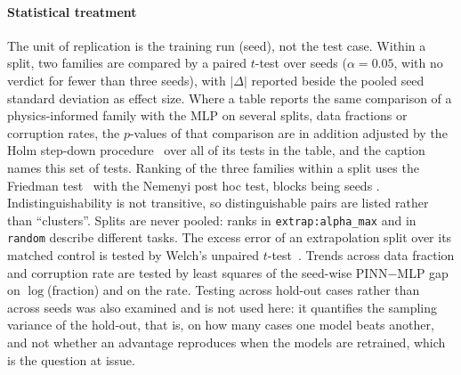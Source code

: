 \paragraph{Statistical treatment}
The unit of replication is the training run (seed), not the test case. Within a
split, two families are compared by a paired $t$-test over seeds ($\alpha=0.05$,
with no verdict for fewer than three seeds), with $|\Delta|$ reported beside the pooled
seed standard deviation as effect size.
Where a table reports the same comparison of a physics-informed family with the MLP
on several splits, data fractions or corruption rates, the $p$-values of that comparison
are in addition adjusted by the Holm step-down procedure~\citep{holm1979} over all of its
tests in the table, and the caption names this set of tests. %
Ranking of the three families within a split uses the Friedman
test~\citep{friedman1937} with the Nemenyi post hoc test, blocks being seeds
\citep{demsar2006}. Indistinguishability is not
transitive, so distinguishable pairs are listed rather than ``clusters''.
Splits are never pooled: ranks in \texttt{extrap:alpha\_max} and in
\texttt{random} describe different tasks.
The excess error of an extrapolation split over its matched control is tested by
Welch's unpaired $t$-test~\citep{welch1947}. Trends across data fraction and corruption rate are tested by
least squares of the seed-wise PINN$-$MLP gap on $\log$(fraction) and on the rate.
Testing across hold-out cases rather than across seeds was also examined and is not used here:
it quantifies the sampling variance of the hold-out, that is, on how many cases one model beats
another, and not whether an advantage reproduces when the models are retrained, which is the
question at issue.

